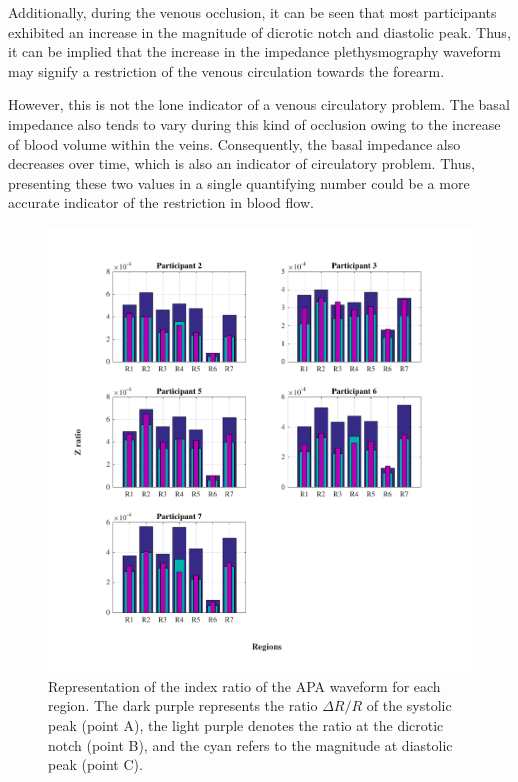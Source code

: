 Additionally, during the venous occlusion, it can be seen that most participants exhibited an increase in the magnitude of dicrotic notch and diastolic peak. Thus, it can be implied that the increase in the impedance plethysmography waveform may signify a restriction of the venous circulation towards the forearm. 

However, this is not the lone indicator of a venous circulatory problem. The basal impedance also tends to vary during this kind of occlusion owing to the increase of blood volume within the veins. Consequently, the basal impedance also decreases over time, which is also an indicator of circulatory problem. Thus, presenting these two values in a single quantifying number could be a more accurate indicator of the restriction in blood flow. 

\begin{figure}[!htpb]
	\includegraphics[width=1\textwidth,keepaspectratio]{figure_apa_9}    
	\caption[Bland and Altman plot of the relation between LDF and iPG]{Representation of the index ratio of the APA waveform for each region. The dark purple represents the ratio $\Delta R/ R$ of the systolic peak (point A), the light purple denotes the ratio at the dicrotic notch (point B), and the cyan refers to the magnitude at diastolic peak (point C).}
	\label{fig:ration Z bar}
\end{figure}


